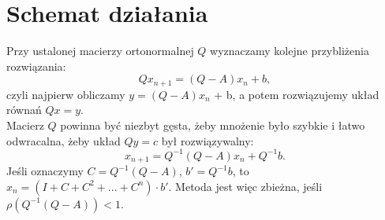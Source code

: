 \section{Schemat działania}
Przy ustalonej macierzy ortonormalnej \( Q \) wyznaczamy kolejne przybliżenia rozwiązania:
\[
	Qx_{n+1} = (Q - A)x_n + b,
\]
czyli najpierw obliczamy \( y = (Q - A)x_n \) + b, a potem rozwiązujemy układ równań \( Qx = y \). \\
Macierz \( Q \) powinna być niezbyt gęsta, żeby mnożenie było szybkie i łatwo odwracalna, żeby układ \( Qy = c \) był rozwiązywalny:
\[
	x_{n+1} = Q^{-1}(Q - A)x_n + Q^{-1}b.
\]
Jeśli oznaczymy \( C = Q^{-1}(Q - A) \), \( b' = Q^{-1}b \), to \( x_n = (I + C + C^2 + . . . + C^n) \cdot b' \). Metoda jest więc zbieżna, jeśli \( \rho(Q^{-1}(Q - A)) < 1 \).
